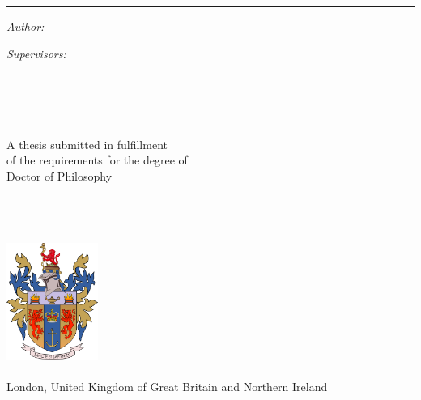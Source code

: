 \begin{titlepage}
  \doublespacing
  \large
  \hfill
  \vfill
  \vspace*{0.5cm}
  \begin{center}
    \doublespacing
    \textcolor{Maroon}{\Large\textbf{\myTitle}}
  \end{center}
  \vspace{0.75cm}
  \hrule
  \vspace{1.cm}
  \onehalfspacing
  \begin{center}

    \begin{minipage}[t]{0.5\textwidth}
      \begin{flushleft}
        \emph{Author:}\\
        \href{\myWebsite}{{\myFirstName} \textsc{\myLastName}}
      \end{flushleft}
    \end{minipage}
    \begin{minipage}[t]{0.4\textwidth}
      \begin{flushright}
        \emph{Supervisors:} \\
        \href{\myProfWebsite}{{\myProfTitle} {\myProfFirstName} \textsc{\myProfLastName}}\\
        \href{\mySecondProfWebsite}{{\mySecondProfTitle} {\mySecondProfFirstName} \textsc{\mySecondProfLastName}}\\
        \href{\myThirdProfWebsite}{{\myThirdProfTitle} {\myThirdProfFirstName} \textsc{\myThirdProfLastName}}\\
      \end{flushright}
    \end{minipage}\\[1.5cm]
    
    A thesis submitted in fulfillment\\
    of the requirements for the degree of\\
    {Doctor of Philosophy}\\[1cm]
    
    \href{\TSCMWebsite}{\TSCM}\\
    \href{\PNWebsite}{\PN}\\
    \mySchool\\
    \myFaculty
    \hfill
    \vfill

    \includegraphics[width=3cm]{figures/Logo.png}\\
    \href{https://www.kcl.ac.uk/}{\myUni}\\
    London, United Kingdom of Great Britain and Northern Ireland\\[2em]
    {\mySubmissionMonth} {\mySubmissionYear}
  \end{center}
\end{titlepage}
